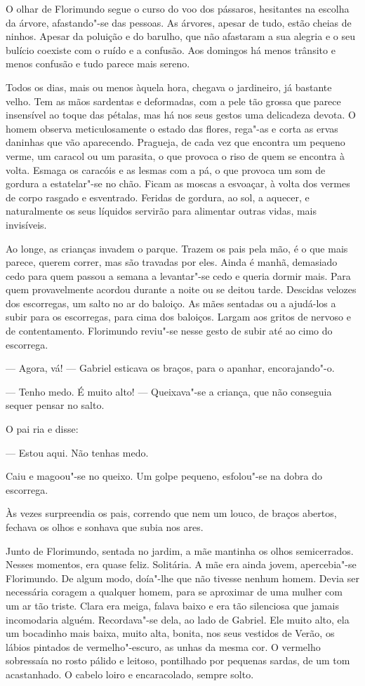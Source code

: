 O olhar de Florimundo segue o curso do voo dos pássaros, hesitantes na
escolha da árvore, afastando"-se das pessoas. As árvores, apesar de tudo,
estão cheias de ninhos. Apesar da poluição e do barulho, que não
afastaram a sua alegria e o seu bulício coexiste com o ruído e a
confusão. Aos domingos há menos trânsito e menos confusão e tudo parece
mais sereno.

Todos os dias, mais ou menos àquela hora, chegava o jardineiro, já
bastante velho. Tem as mãos sardentas e deformadas, com a pele tão
grossa que parece insensível ao toque das pétalas, mas há nos seus
gestos uma delicadeza devota. O homem observa meticulosamente o estado
das flores, rega"-as e corta as ervas daninhas que vão aparecendo.
Pragueja, de cada vez que encontra um pequeno verme, um caracol ou um
parasita, o que provoca o riso de quem se encontra à volta. Esmaga os
caracóis e as lesmas com a pá, o que provoca um som de gordura a
estatelar"-se no chão. Ficam as moscas a esvoaçar, à volta dos vermes de
corpo rasgado e esventrado. Feridas de gordura, ao sol, a aquecer, e
naturalmente os seus líquidos servirão para alimentar outras vidas, mais
invisíveis.

Ao longe, as crianças invadem o parque. Trazem os pais pela mão, é o que
mais parece, querem correr, mas são travadas por eles. Ainda é manhã,
demasiado cedo para quem passou a semana a levantar"-se cedo e queria
dormir mais. Para quem provavelmente acordou durante a noite ou se
deitou tarde. Descidas velozes dos escorregas, um salto no ar do
baloiço. As mães sentadas ou a ajudá-los a subir para os escorregas,
para cima dos baloiços. Largam aos gritos de nervoso e de contentamento.
Florimundo reviu"-se nesse gesto de subir até ao cimo do escorrega.

--- Agora, vá! --- Gabriel esticava os braços, para o apanhar,
encorajando"-o.

--- Tenho medo. É muito alto! --- Queixava"-se a criança, que não conseguia
sequer pensar no salto.

O pai ria e disse:

--- Estou aqui. Não tenhas medo.

Caiu e magoou"-se no queixo. Um golpe pequeno, esfolou"-se na dobra do
escorrega.

Às vezes surpreendia os pais, correndo que nem um louco, de braços
abertos, fechava os olhos e sonhava que subia nos ares.

Junto de Florimundo, sentada no jardim, a mãe mantinha os olhos
semicerrados. Nesses momentos, era quase feliz. Solitária. A mãe era
ainda jovem, apercebia"-se Florimundo. De algum modo, doía"-lhe que não
tivesse nenhum homem. Devia ser necessária coragem a qualquer homem,
para se aproximar de uma mulher com um ar tão triste. Clara era meiga,
falava baixo e era tão silenciosa que jamais incomodaria alguém.
Recordava"-se dela, ao lado de Gabriel. Ele muito alto, ela um bocadinho
mais baixa, muito alta, bonita, nos seus vestidos de Verão, os lábios
pintados de vermelho"-escuro, as unhas da mesma cor. O vermelho
sobressaía no rosto pálido e leitoso, pontilhado por pequenas sardas, de
um tom acastanhado. O cabelo loiro e encaracolado, sempre solto.

